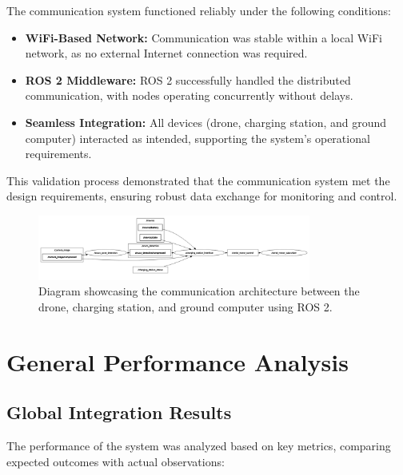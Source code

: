 The communication system functioned reliably under the following conditions:
\begin{itemize}
    \item \textbf{WiFi-Based Network:} Communication was stable within a local WiFi network, as no external Internet connection was required.
    \item \textbf{ROS 2 Middleware:} ROS 2 successfully handled the distributed communication, with nodes operating concurrently without delays.
    \item \textbf{Seamless Integration:} All devices (drone, charging station, and ground computer) interacted as intended, supporting the system's operational requirements.
\end{itemize}

This validation process demonstrated that the communication system met the design requirements, ensuring robust data exchange for monitoring and control.

\begin{figure}[H]
    \centering
    \includegraphics[width=0.8\textwidth]{pictures/complete_node_diagram.png}
    \caption{Diagram showcasing the communication architecture between the drone, charging station, and ground computer using ROS 2.}
    \label{fig:communication_validation}
\end{figure}

\section{General Performance Analysis}

\subsection{Global Integration Results}

The performance of the system was analyzed based on key metrics, comparing expected outcomes with actual observations:

